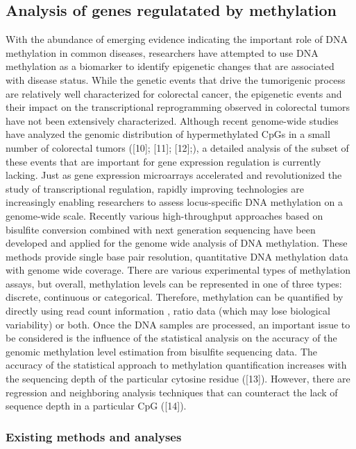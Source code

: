 \documentclass[10pt,letterpaper]{article}
\begin{document}
\hypertarget{analysis-of-genes-regulatated-by-methylation}{%
\subsection{Analysis of genes regulatated by
methylation}\label{analysis-of-genes-regulatated-by-methylation}}

With the abundance of emerging evidence indicating the important role of
DNA methylation in common diseases, researchers have attempted to use
DNA methylation as a biomarker to identify epigenetic changes that are
associated with disease status. While the genetic events that drive the
tumorigenic process are relatively well characterized for colorectal
cancer, the epigenetic events and their impact on the transcriptional
reprogramming observed in colorectal tumors have not been extensively
characterized. Although recent genome-wide studies have analyzed the
genomic distribution of hypermethylated CpGs in a small number of
colorectal tumors ({[}10{]}; {[}11{]}; {[}12{]};), a detailed analysis of the 
subset of these events that are important for gene expression regulation is 
currently lacking. Just as gene expression microarrays accelerated and
revolutionized the study of transcriptional regulation, rapidly
improving technologies are increasingly enabling researchers to assess
locus-specific DNA methylation on a genome-wide scale. Recently various
high-throughput approaches based on bisulfite conversion combined with
next generation sequencing have been developed and applied for the
genome wide analysis of DNA methylation. These methods provide single
base pair resolution, quantitative DNA methylation data with genome wide
coverage. There are various experimental types of methylation assays,
but overall, methylation levels can be represented in one of three
types: discrete, continuous or categorical. Therefore, methylation can
be quantified by directly using read count information , ratio data
(which may lose biological variability) or both. Once the DNA samples
are processed, an important issue to be considered is the influence of
the statistical analysis on the accuracy of the genomic methylation
level estimation from bisulfite sequencing data. The accuracy of the
statistical approach to methylation quantification increases with the
sequencing depth of the particular cytosine residue ({[}13{]}). However,
there are regression and neighboring analysis techniques that can
counteract the lack of sequence depth in a particular CpG ({[}14{]}).

\hypertarget{existing-methods-and-analyses}{%
\subsubsection{Existing methods and
analyses}\label{existing-methods-and-analyses}}
\end{document}
